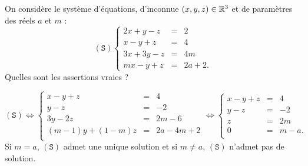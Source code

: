 \begin{question}
On considère le système d'équations, d'inconnue $(x,y,z)\in \mathbb{R}^3$ et de paramètres des réels $a$ et $m$ : 
$$(\mathtt{S})  
\left\{\begin{array}{rcc}
2x+y-z&=&2\\
x-y+z&=&4\\ 
3x+3y-z&=&4m \\
mx-y+z&=&2a+2. \end{array}\right.$$
Quelles sont les assertions vraies ?
\begin{answers}
\end{answers}
\begin{explanations} 
$$(\mathtt{S}) \Leftrightarrow 
\left\{\begin{array}{rcc}
x-y+z&=&4\\
y-z&=&-2\\ 
3y-2z&=&2m-6 \\
(m-1)y+(1-m)z&=&2a-4m+2 \\
\end{array}\right. \Leftrightarrow 
\left\{\begin{array}{rcc}
x-y+z&=&4\\
y-z&=&-2\\ 
z&=&2m \\
0&=&m-a. \\
\end{array}\right.$$
Si $m=a$, $(\mathtt{S})$ admet une unique solution et si $m\neq a$, $(\mathtt{S})$ n'admet pas de solution.
\end{explanations}
\end{question}




